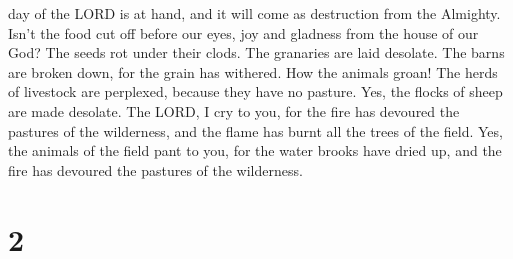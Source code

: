 day of the LORD is at hand, and it will come as destruction from the
Almighty.  Isn't the food cut off before our eyes, joy
and gladness from the house of our God?  The seeds rot
under their clods. The granaries are laid desolate. The barns are broken
down, for the grain has withered.  How the animals groan!
The herds of livestock are perplexed, because they have no pasture. Yes,
the flocks of sheep are made desolate.  The LORD, I cry
to you, for the fire has devoured the pastures of the wilderness, and
the flame has burnt all the trees of the field.  Yes, the
animals of the field pant to you, for the water brooks have dried up,
and the fire has devoured the pastures of the wilderness.

\hypertarget{section-1}{%
\section{2}\label{section-1}}

